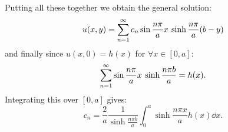 \begin{enumerate}
    \newpage

    Putting all these together we obtain the general solution:
    $$u(x,y)=\sum_{n=1}^{\infty}
    c_n
    \sin\frac{n\pi}{a}x
    \hspace{0.03in}
    \sinh\frac{n\pi}{a}(b-y)$$
    and finally since $u(x,0)=h(x)$ for $\forall x\in[0,a]$:
    $$\sum_{n=1}^{\infty}\sin\frac{n\pi}{a}x\hspace{0.03in}
    \sinh\frac{n\pi b}{a}
    =h(x).$$
    Integrating this over $[0,a]$ gives:
    $$c_n=\frac{2}{a}\frac{1}{\sinh\frac{n\pi b}{a}}
    \int_{0}^{a}\sinh\frac{n\pi x}{a}h(x)\dd x.$$
\end{enumerate}